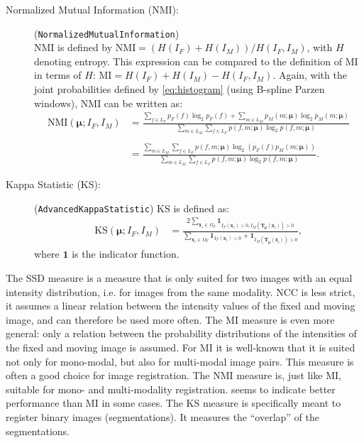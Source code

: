 \documentclass[]{report}
\newcommand{\vx}{\bm{x}}
\newcommand{\vmu}{\bm{\mu}}
\newcommand{\vT}{\bm{T}}
\begin{document}
\begin{description}
\item[Normalized Mutual Information (NMI):]
(\texttt{NormalizedMutualInformation})\\ NMI is defined by
$\mathrm{NMI} = ( H(I_F) + H(I_M) ) / H(I_F,I_M)$, with $H$
denoting entropy. This expression can be compared to the
definition of MI in terms of $H$: $\mathrm{MI} = H(I_F) + H(I_M) -
H(I_F,I_M)$. Again, with the joint probabilities defined by
\ref{eq:histogram} (using B-spline Parzen windows), NMI can be
written as:
\begin{align}
\mathrm{NMI}(\vmu; I_F, I_M) &=
 \frac{\sum\limits_{f\in L_F} p_F(f)
 \log_2 p_F(f) + \sum\limits_{m\in L_M} p_M(m;\vmu) \log_2 p_M(m;\vmu)}
 { \sum\limits_{m\in L_M} \sum\limits_{f\in L_F}
 p(f,m;\vmu) \log_2 p(f,m;\vmu)} \nonumber \\ \nonumber \\
 &= \frac{\sum\limits_{m\in L_M} \sum\limits_{f\in L_F} p(f,m;\vmu) \log_2
 \left( p_F(f) p_M(m;\vmu) \right)}{ \sum\limits_{m\in L_M} \sum\limits_{f\in L_F}
 p(f,m;\vmu) \log_2 p(f,m;\vmu) }. \label{eq:NMI}
\end{align}

\item[Kappa Statistic (KS):] (\texttt{AdvancedKappaStatistic})
KS is defined as:
\begin{align}
\mathrm{KS}(\vmu;I_F,I_M) &= \frac{ 2 \sum\limits_{\vx_i \in
\Omega_F} \mathbf{1}_{I_F(\vx_i) > 0, I_M(\vT_{\vmu}(\vx_i)) >
0}}{\sum\limits_{\vx_i \in \Omega_F} \mathbf{1}_{I_F(\vx_i) > 0} +
\mathbf{1}_{I_M(\vT_{\vmu}(\vx_i)) > 0}}, \label{eq:KS}
\end{align}
where $\mathbf{1}$ is the indicator function.

\end{description}

The SSD measure is a measure that is only suited for two images with
an equal intensity distribution, i.e. for images from the same
modality. NCC is less strict, it assumes a linear relation between
the intensity values of the fixed and moving image, and can therefore
be used more often. The MI measure is even more general: only a
relation between the probability distributions of the intensities of
the fixed and moving image is assumed. For MI it is well-known that
it is suited not only for mono-modal, but also for multi-modal image
pairs. This measure is often a good choice for image registration.
The NMI measure is, just like MI, suitable for mono- and
multi-modality registration. \cite{Stu99:NMI} seems to indicate
better performance than MI in some cases. The KS measure is
specifically meant to register binary images (segmentations). It
measures the ``overlap'' of the segmentations.
\end{document}
